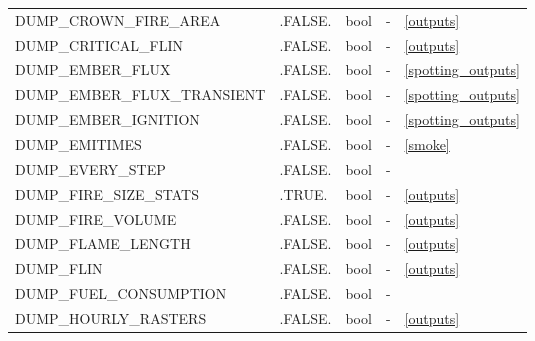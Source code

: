 \begin{landscape}
\begin{center}
\begin{longtable}{lllll}
DUMP\_CROWN\_FIRE\_AREA                      & .FALSE.                    & bool                   & -                                  & \ref{outputs}                        \\
DUMP\_CRITICAL\_FLIN                         & .FALSE.                    & bool                   & -                                  & \ref{outputs}                        \\
DUMP\_EMBER\_FLUX                            & .FALSE.                    & bool                   & -                                  & \ref{spotting_outputs}                        \\
DUMP\_EMBER\_FLUX\_TRANSIENT                 & .FALSE.                    & bool                   & -                                  &  \ref{spotting_outputs}\\
DUMP\_EMBER\_IGNITION                        & .FALSE.                    & bool                   & -                                  & \ref{spotting_outputs}  \\
DUMP\_EMITIMES                               & .FALSE.                    & bool                   & -                                  & \ref{smoke}                          \\
DUMP\_EVERY\_STEP                            & .FALSE.                    & bool                   & -                                  &  \\
DUMP\_FIRE\_SIZE\_STATS                      & .TRUE.                     & bool                   & -                                  & \ref{outputs}                        \\
DUMP\_FIRE\_VOLUME                           & .FALSE.                    & bool                   & -                                  & \ref{outputs}                        \\
DUMP\_FLAME\_LENGTH                          & .FALSE.                    & bool                   & -                                  & \ref{outputs}                        \\
DUMP\_FLIN                                   & .FALSE.                    & bool                   & -                                  & \ref{outputs}                        \\
DUMP\_FUEL\_CONSUMPTION                      & .FALSE.                    & bool                   & -                                  &  \\
DUMP\_HOURLY\_RASTERS                        & .FALSE.                    & bool                   & -                                  & \ref{outputs}                        \\

\end{longtable}
\end{center}
\end{landscape}
